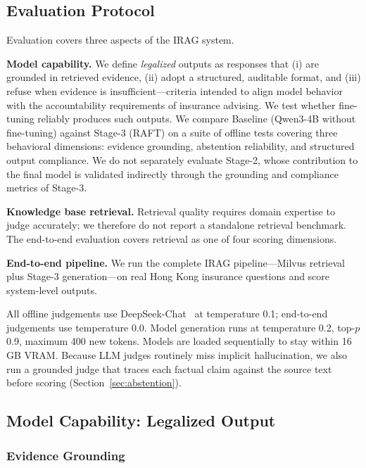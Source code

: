 \subsection{Evaluation Protocol}

Evaluation covers three aspects of the IRAG system.

\noindent\textbf{Model capability.}
We define \emph{legalized} outputs as responses that (i) are grounded in
retrieved evidence, (ii) adopt a structured, auditable format, and
(iii) refuse when evidence is insufficient---criteria intended to align model
behavior with the accountability requirements of insurance advising.
We test whether fine-tuning reliably produces such outputs.
We compare Baseline (Qwen3-4B without fine-tuning) against Stage-3 (RAFT) on
a suite of offline tests covering three behavioral dimensions:
evidence grounding, abstention reliability, and structured output compliance.
We do not separately evaluate Stage-2, whose contribution to the final model
is validated indirectly through the grounding and compliance metrics of Stage-3.

\noindent\textbf{Knowledge base retrieval.}
Retrieval quality requires domain expertise to judge accurately; we therefore
do not report a standalone retrieval benchmark.
The end-to-end evaluation covers retrieval as one of four scoring dimensions.

\noindent\textbf{End-to-end pipeline.}
We run the complete IRAG pipeline---Milvus retrieval plus Stage-3
generation---on real Hong Kong insurance questions and score system-level outputs.

All offline judgements use DeepSeek-Chat~\cite{deepseek} at temperature 0.1;
end-to-end judgements use temperature 0.0.
Model generation runs at temperature 0.2, top-$p$ 0.9, maximum 400 new tokens.
Models are loaded sequentially to stay within 16\,GB VRAM.
Because LLM judges routinely miss implicit hallucination, we also run a grounded
judge that traces each factual claim against the source text before scoring
(Section~\ref{sec:abstention}).

\subsection{Model Capability: Legalized Output}

\subsubsection{Evidence Grounding}

